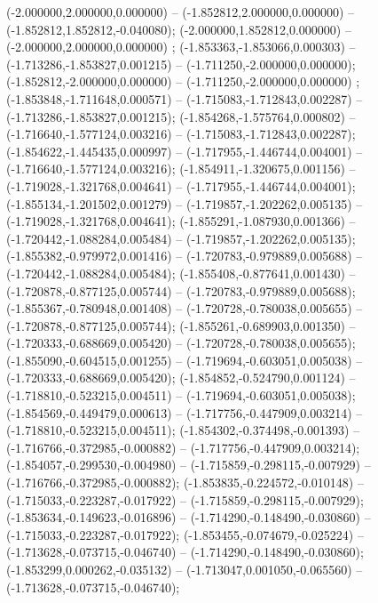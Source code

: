  (-2.000000,2.000000,0.000000) -- (-1.852812,2.000000,0.000000) -- (-1.852812,1.852812,-0.040080);
 (-2.000000,1.852812,0.000000) -- (-2.000000,2.000000,0.000000) ;
 (-1.853363,-1.853066,0.000303) -- (-1.713286,-1.853827,0.001215) -- (-1.711250,-2.000000,0.000000);
 (-1.852812,-2.000000,0.000000) -- (-1.711250,-2.000000,0.000000) ;
 (-1.853848,-1.711648,0.000571) -- (-1.715083,-1.712843,0.002287) -- (-1.713286,-1.853827,0.001215);
 (-1.854268,-1.575764,0.000802) -- (-1.716640,-1.577124,0.003216) -- (-1.715083,-1.712843,0.002287);
 (-1.854622,-1.445435,0.000997) -- (-1.717955,-1.446744,0.004001) -- (-1.716640,-1.577124,0.003216);
 (-1.854911,-1.320675,0.001156) -- (-1.719028,-1.321768,0.004641) -- (-1.717955,-1.446744,0.004001);
 (-1.855134,-1.201502,0.001279) -- (-1.719857,-1.202262,0.005135) -- (-1.719028,-1.321768,0.004641);
 (-1.855291,-1.087930,0.001366) -- (-1.720442,-1.088284,0.005484) -- (-1.719857,-1.202262,0.005135);
 (-1.855382,-0.979972,0.001416) -- (-1.720783,-0.979889,0.005688) -- (-1.720442,-1.088284,0.005484);
 (-1.855408,-0.877641,0.001430) -- (-1.720878,-0.877125,0.005744) -- (-1.720783,-0.979889,0.005688);
 (-1.855367,-0.780948,0.001408) -- (-1.720728,-0.780038,0.005655) -- (-1.720878,-0.877125,0.005744);
 (-1.855261,-0.689903,0.001350) -- (-1.720333,-0.688669,0.005420) -- (-1.720728,-0.780038,0.005655);
 (-1.855090,-0.604515,0.001255) -- (-1.719694,-0.603051,0.005038) -- (-1.720333,-0.688669,0.005420);
 (-1.854852,-0.524790,0.001124) -- (-1.718810,-0.523215,0.004511) -- (-1.719694,-0.603051,0.005038);
 (-1.854569,-0.449479,0.000613) -- (-1.717756,-0.447909,0.003214) -- (-1.718810,-0.523215,0.004511);
 (-1.854302,-0.374498,-0.001393) -- (-1.716766,-0.372985,-0.000882) -- (-1.717756,-0.447909,0.003214);
 (-1.854057,-0.299530,-0.004980) -- (-1.715859,-0.298115,-0.007929) -- (-1.716766,-0.372985,-0.000882);
 (-1.853835,-0.224572,-0.010148) -- (-1.715033,-0.223287,-0.017922) -- (-1.715859,-0.298115,-0.007929);
 (-1.853634,-0.149623,-0.016896) -- (-1.714290,-0.148490,-0.030860) -- (-1.715033,-0.223287,-0.017922);
 (-1.853455,-0.074679,-0.025224) -- (-1.713628,-0.073715,-0.046740) -- (-1.714290,-0.148490,-0.030860);
 (-1.853299,0.000262,-0.035132) -- (-1.713047,0.001050,-0.065560) -- (-1.713628,-0.073715,-0.046740);

